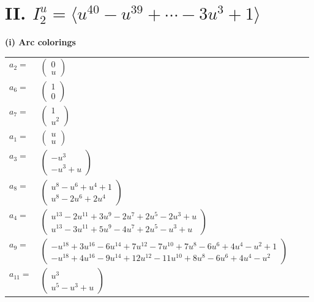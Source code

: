 \documentclass[1p]{elsarticle_modified}
\theoremstyle{definition}
\begin{document}
\centering \section*{II. $I^u_{2}= \langle u^{40}- u^{39}+\cdots-3 u^3+1 \rangle$}
\flushleft \textbf{(i) Arc colorings}\\
\begin{tabular}{m{7pt} m{180pt} m{7pt} m{180pt} }
\flushright $a_{2}=$&$\begin{pmatrix}0\\u\end{pmatrix}$ \\
\flushright $a_{6}=$&$\begin{pmatrix}1\\0\end{pmatrix}$ \\
\flushright $a_{7}=$&$\begin{pmatrix}1\\u^2\end{pmatrix}$ \\
\flushright $a_{1}=$&$\begin{pmatrix}u\\u\end{pmatrix}$ \\
\flushright $a_{3}=$&$\begin{pmatrix}- u^3\\- u^3+u\end{pmatrix}$ \\
\flushright $a_{8}=$&$\begin{pmatrix}u^8- u^6+u^4+1\\u^8-2 u^6+2 u^4\end{pmatrix}$ \\
\flushright $a_{4}=$&$\begin{pmatrix}u^{13}-2 u^{11}+3 u^9-2 u^7+2 u^5-2 u^3+u\\u^{13}-3 u^{11}+5 u^9-4 u^7+2 u^5- u^3+u\end{pmatrix}$ \\
\flushright $a_{9}=$&$\begin{pmatrix}- u^{18}+3 u^{16}-6 u^{14}+7 u^{12}-7 u^{10}+7 u^8-6 u^6+4 u^4- u^2+1\\- u^{18}+4 u^{16}-9 u^{14}+12 u^{12}-11 u^{10}+8 u^8-6 u^6+4 u^4- u^2\end{pmatrix}$ \\
\flushright $a_{11}=$&$\begin{pmatrix}u^3\\u^5- u^3+u\end{pmatrix}$ \\

\end{tabular}
\end{document}
